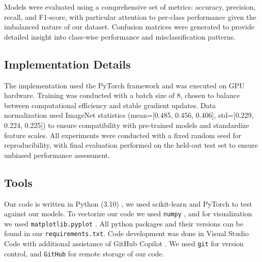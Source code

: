 Models were evaluated using a comprehensive set of metrics: accuracy, precision, recall, and F1-score, with particular attention to per-class performance given the imbalanced nature of our dataset. Confusion matrices were generated to provide detailed insight into class-wise performance and misclassification patterns.

\clearpage

\subsection{Implementation Details}
The implementation used the PyTorch framework and was executed on GPU hardware. Training was conducted with a batch size of 8, chosen to balance between computational efficiency and stable gradient updates. Data normalization used ImageNet statistics (mean=[0.485, 0.456, 0.406], std=[0.229, 0.224, 0.225]) to ensure compatibility with pre-trained models and standardize feature scales. All experiments were conducted with a fixed random seed for reproducibility, with final evaluation performed on the held-out test set to ensure unbiased performance assessment.

\subsection{Tools}\label{subsec:tools}
Our code is written in Python (3.10) \cite{Python}, we used scikit-learn \cite{scikit-learn} and PyTorch\cite{PyTorch} to test against our models. To vectorize our code we used \verb|numpy| \cite{Numpy}, and for visualization we used \verb|matplotlib.pyplot| \cite{Matplotlib}. All python packages and their versions can be found in our \verb|requirements.txt|. Code development was done in Visual Studio Code \cite{VSCode} with additional assistance of GitHub Copilot \cite{Copilot}. We used \verb|git| \cite{Git} for version control, and \verb|GitHub| \cite{GitHub} for remote storage of our code.

\onecolumngrid

\twocolumngrid